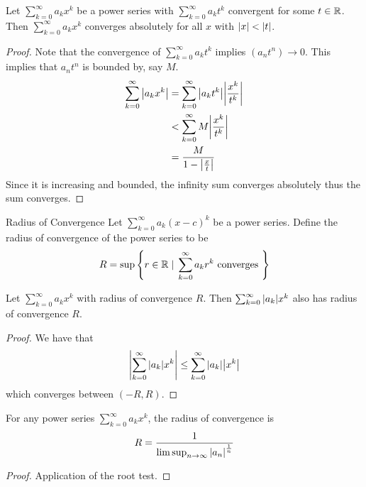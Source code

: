\documentclass[a4paper]{article}
\begin{document}
\begin{thm}{}{} Let $\sum_{k=0}^{\infty}a_kx^k$ be a power series with $\sum_{k=0}^{\infty}a_kt^k$ convergent for some $t\in\mathbb{R}$. Then $\sum_{k=0}^{\infty}a_kx^k$ converges absolutely for all $x$ with $\abs{x}<\abs{t}$. \tcbline
\begin{proof} Note that the convergence of $\sum_{k=0}^{\infty}a_kt^k$ implies $(a_nt^n)\to 0$. This implies that $a_nt^n$ is bounded by, say $M$. 
\begin{align*}
\sum_{k=0}^{\infty}\abs{a_kx^k}&=\sum_{k=0}^{\infty}\abs{a_kt^k}\abs{\frac{x^k}{t^k}}\\
&<\sum_{k=0}^{\infty}M\abs{\frac{x^k}{t^k}}\\
&=\frac{M}{1-\abs{\frac{x}{t}}}\\
\end{align*} Since it is increasing and bounded, the infinity sum converges absolutely thus the sum converges. 
\end{proof}
\end{thm}

\begin{defn}{Radius of Convergence}{} Let $\sum_{k=0}^\infty a_k(x-c)^k$ be a power series. Define the radius of convergence of the power series to be $$R=\sup\left\{r\in\mathbb{R}\;|\;\sum_{k=0}^\infty a_kr^k\text{ converges }\right\}$$
\end{defn}

\begin{prp}{}{} Let $\sum_{k=0}^{\infty}a_kx^k$ with radius of convergence $R$. Then $\sum_{k=0}^{\infty}\abs{a_k}x^k$ also has radius of convergence $R$. \tcbline
\begin{proof} We have that $$\abs{\sum_{k=0}^{\infty}\abs{a_k}x^k}\leq\sum_{k=0}^{\infty}\abs{a_k}\abs{x^k}$$ which converges between $(-R,R)$. 
\end{proof}
\end{prp}

\begin{thm}{}{} For any power series $\sum_{k=0}^\infty a_kx^k$, the radius of convergence is $$R=\frac{1}{\limsup_{n\to\infty}\abs{a_n}^{\frac{1}{n}}}$$ 
\begin{proof} Application of the root test. 
\end{proof}
\end{thm}
\end{document}
